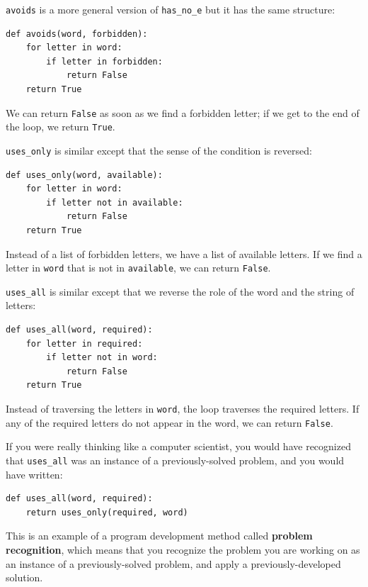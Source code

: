 \documentclass[10pt]{book}
\begin{document}


{\tt avoids} is a more general version of \verb"has_no_e" but it
has the same structure:

\begin{verbatim}
def avoids(word, forbidden):
    for letter in word:
        if letter in forbidden:
            return False
    return True
\end{verbatim}
%
We can return {\tt False} as soon as we find a forbidden letter;
if we get to the end of the loop, we return {\tt True}.

\verb"uses_only" is similar except that the sense of the condition
is reversed:

\begin{verbatim}
def uses_only(word, available):
    for letter in word: 
        if letter not in available:
            return False
    return True
\end{verbatim}
%
Instead of a list of forbidden letters, we have a list of available
letters.  If we find a letter in {\tt word} that is not in
{\tt available}, we can return {\tt False}.

\verb"uses_all" is similar except that we reverse the role
of the word and the string of letters:

\begin{verbatim}
def uses_all(word, required):
    for letter in required: 
        if letter not in word:
            return False
    return True
\end{verbatim}
%
Instead of traversing the letters in {\tt word}, the loop
traverses the required letters.  If any of the required letters
do not appear in the word, we can return {\tt False}.

If you were really thinking like a computer scientist, you would
have recognized that \verb"uses_all" was an instance of a
previously-solved problem, and you would have written:

\begin{verbatim}
def uses_all(word, required):
    return uses_only(required, word)
\end{verbatim}
%
This is an example of a program development method called {\bf problem
recognition}, which means that you recognize the problem you are
working on as an instance of a previously-solved problem, and apply a
previously-developed solution.
\end{document}
